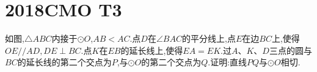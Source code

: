 \documentclass[]{article}
\title{}
\author{}
\date{}
\begin{document}
\maketitle
\section{2018CMO T3}{
如图,$\triangle ABC$内接于$\odot O$,$AB<AC$.点$D$在$\angle BAC$的平分线上,点$E$在边$BC$上,使得$OE//AD,DE\perp BC$.点$K$在$EB$的延长线上,使得$EA=EK$.过$A、K、D$三点的圆与$BC$的延长线的第二个交点为$P$,与$\odot O$的第二个交点为$Q$.证明:直线$PQ$与$\odot O$相切.


}
\end{document}
